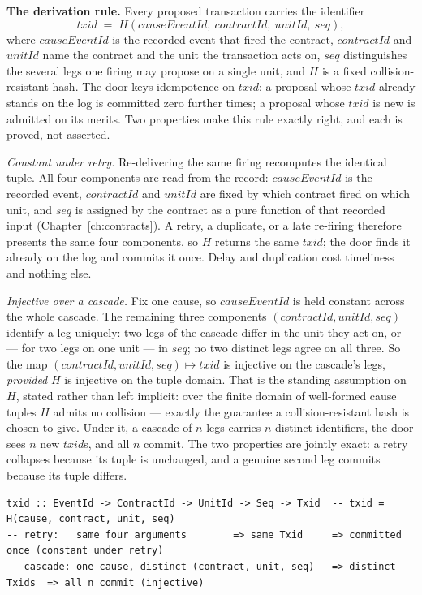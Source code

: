 \documentclass[11pt,a4paper]{article}
\begin{document}
\textbf{The derivation rule.} Every proposed transaction carries the identifier
\[
  \mathit{txid} \;=\; H(\mathit{causeEventId},\ \mathit{contractId},\ \mathit{unitId},\ \mathit{seq}),
\]
where $\mathit{causeEventId}$ is the recorded event that fired the contract,
$\mathit{contractId}$ and $\mathit{unitId}$ name the contract and the unit the
transaction acts on, $\mathit{seq}$ distinguishes the several legs one firing may
propose on a single unit, and $H$ is a fixed collision-resistant hash. The door keys
idempotence on $\mathit{txid}$: a proposal whose $\mathit{txid}$ already stands on the
log is committed zero further times; a proposal whose $\mathit{txid}$ is new is
admitted on its merits. Two properties make this rule exactly right, and each is
proved, not asserted.

\emph{Constant under retry.} Re-delivering the same firing recomputes the identical
tuple. All four components are read from the record: $\mathit{causeEventId}$ is the
recorded event, $\mathit{contractId}$ and $\mathit{unitId}$ are fixed by which
contract fired on which unit, and $\mathit{seq}$ is assigned by the contract as a pure
function of that recorded input (Chapter~\ref{ch:contracts}). A retry, a duplicate, or
a late re-firing therefore presents the same four components, so $H$ returns the same
$\mathit{txid}$; the door finds it already on the log and commits it once. Delay and
duplication cost timeliness and nothing else.

\emph{Injective over a cascade.} Fix one cause, so $\mathit{causeEventId}$ is held
constant across the whole cascade. The remaining three components
$(\mathit{contractId}, \mathit{unitId}, \mathit{seq})$ identify a leg uniquely: two
legs of the cascade differ in the unit they act on, or --- for two legs on one unit
--- in $\mathit{seq}$; no two distinct legs agree on all three. So the map
$(\mathit{contractId}, \mathit{unitId}, \mathit{seq}) \mapsto \mathit{txid}$ is
injective on the cascade's legs, \emph{provided} $H$ is injective on the tuple domain.
That is the standing assumption on $H$, stated rather than left implicit: over the
finite domain of well-formed cause tuples $H$ admits no collision --- exactly the
guarantee a collision-resistant hash is chosen to give. Under it, a cascade of $n$
legs carries $n$ distinct identifiers, the door sees $n$ new $\mathit{txid}$s, and all
$n$ commit. The two properties are jointly exact: a retry collapses because its tuple
is unchanged, and a genuine second leg commits because its tuple differs.

\begin{lstlisting}
txid :: EventId -> ContractId -> UnitId -> Seq -> Txid  -- txid = H(cause, contract, unit, seq)
-- retry:   same four arguments        => same Txid     => committed once (constant under retry)
-- cascade: one cause, distinct (contract, unit, seq)   => distinct Txids  => all n commit (injective)
\end{lstlisting}
\end{document}
